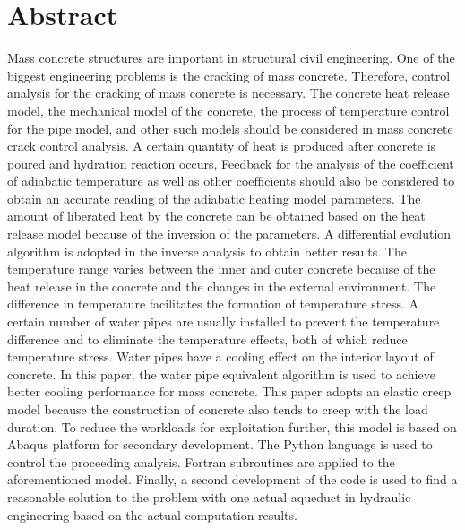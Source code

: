 \documentclass[article,A4,11pt]{llncs}%
\begin{document}
\section*{Abstract}
Mass concrete structures are important in structural civil engineering. One of the biggest engineering problems is the cracking of mass concrete. Therefore, control analysis for the cracking of mass concrete is necessary. The concrete heat release model, the mechanical model of the concrete, the process of temperature control for the pipe model, and other such models should be considered in mass concrete crack control analysis. A certain quantity of heat is produced after concrete is poured and hydration reaction occurs, Feedback for the analysis of the coefficient of adiabatic temperature as well as other coefficients should also be considered to obtain an accurate reading of the adiabatic heating model parameters. The amount of liberated heat by the concrete can be obtained based on the heat release model because of the inversion of the parameters. A differential evolution algorithm is adopted in the inverse analysis to obtain better results.  The temperature range varies between the inner and outer concrete because of the heat release in the concrete and the changes in the external environment. The difference in temperature facilitates the formation of temperature stress. A certain number of water pipes are usually installed to prevent the temperature difference and to eliminate the temperature effects, both of which reduce temperature stress. Water pipes have a cooling effect on the interior layout of concrete. In this paper, the water pipe equivalent algorithm is used to achieve better cooling performance for mass concrete.  This paper adopts an elastic creep model because the construction of concrete also tends to creep with the load duration. To reduce the workloads for exploitation further, this model is based on Abaqus platform for secondary development. The Python language is used to control the proceeding analysis. Fortran subroutines are applied to the aforementioned model. Finally, a second development of the code is used to find a reasonable solution to the problem with one actual aqueduct in hydraulic engineering based on the actual computation results.
\end{document}
